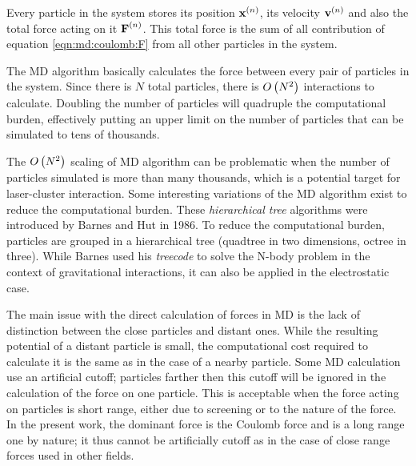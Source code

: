 Every particle in the system stores its position $\textbf{x}^{\left( n \right)}$, its velocity
$\textbf{v}^{\left( n \right)}$ and also the total force acting on it $\textbf{F}^{\left( n \right)}$. This total
force is the sum of all contribution of equation \eqref{eqn:md:coulomb:F} from
all other particles in the system.

The MD algorithm basically calculates the force between every pair of particles
in the system. Since there is $N$ total particles, there is $O\left( N^2 \right)$
interactions to calculate. Doubling the number of particles will quadruple the
computational burden, effectively putting an upper limit on the number of
particles that can be simulated to tens of thousands.

The $O\left( N^2 \right)$ scaling of MD algorithm can be problematic when the number of
particles simulated is more than many thousands, which is a potential target
for laser-cluster interaction. Some interesting variations of the MD algorithm
exist to reduce the computational burden. These \textit{hierarchical tree}
algorithms were introduced\cite{Barnes1986} by Barnes and Hut in 1986. To
reduce the computational burden, particles are grouped in a hierarchical tree
(quadtree in two dimensions, octree in three). While Barnes used his
\textit{treecode} to solve the N-body problem in the context of gravitational
interactions, it can also be applied in the electrostatic case.

The main issue with the direct calculation of forces in MD is the lack of
distinction between the close particles and distant ones. While the resulting
potential of a distant particle is small, the computational cost required to
calculate it is the same as in the case of a nearby particle. Some MD
calculation use an artificial cutoff; particles farther then this cutoff will
be ignored in the calculation of the force on one particle. This is acceptable
when the force acting on particles is short range, either due to screening or
to the nature of the force. In the present work, the dominant force is the
Coulomb force and is a long range one by nature; it thus cannot be artificially
cutoff as in the case of close range forces used in other fields.


